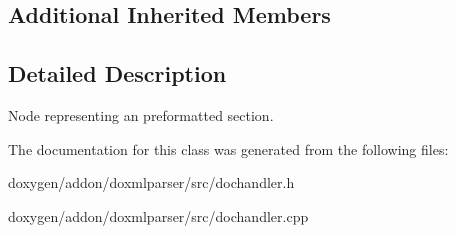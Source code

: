 \subsection*{Additional Inherited Members}


\subsection{Detailed Description}
Node representing an preformatted section. 

The documentation for this class was generated from the following files\+:\begin{DoxyCompactItemize}
\item 
doxygen/addon/doxmlparser/src/dochandler.\+h\item 
doxygen/addon/doxmlparser/src/dochandler.\+cpp\end{DoxyCompactItemize}
